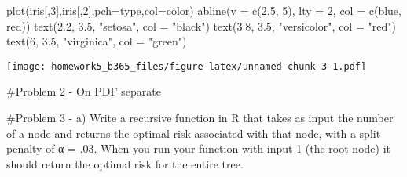 \documentclass[
]{article}
\newenvironment{Shaded}{\begin{snugshade}}{\end{snugshade}}
\newcommand{\AttributeTok}[1]{\textcolor[rgb]{0.77,0.63,0.00}{#1}}
\newcommand{\DecValTok}[1]{\textcolor[rgb]{0.00,0.00,0.81}{#1}}
\newcommand{\FloatTok}[1]{\textcolor[rgb]{0.00,0.00,0.81}{#1}}
\newcommand{\FunctionTok}[1]{\textcolor[rgb]{0.00,0.00,0.00}{#1}}
\newcommand{\NormalTok}[1]{#1}
\newcommand{\StringTok}[1]{\textcolor[rgb]{0.31,0.60,0.02}{#1}}
\begin{document}
\begin{Shaded}
\begin{Highlighting}[]
\FunctionTok{plot}\NormalTok{(iris[,}\DecValTok{3}\NormalTok{],iris[,}\DecValTok{2}\NormalTok{],}\AttributeTok{pch=}\NormalTok{type,}\AttributeTok{col=}\NormalTok{color)}
\FunctionTok{abline}\NormalTok{(}\AttributeTok{v =} \FunctionTok{c}\NormalTok{(}\FloatTok{2.5}\NormalTok{, }\DecValTok{5}\NormalTok{), }\AttributeTok{lty =} \DecValTok{2}\NormalTok{, }\AttributeTok{col =} \FunctionTok{c}\NormalTok{(}\StringTok{\textquotesingle{}blue\textquotesingle{}}\NormalTok{, }\StringTok{\textquotesingle{}red\textquotesingle{}}\NormalTok{))}
\FunctionTok{text}\NormalTok{(}\FloatTok{2.2}\NormalTok{, }\FloatTok{3.5}\NormalTok{, }\StringTok{"setosa"}\NormalTok{, }\AttributeTok{col =} \StringTok{"black"}\NormalTok{)}
\FunctionTok{text}\NormalTok{(}\FloatTok{3.8}\NormalTok{, }\FloatTok{3.5}\NormalTok{, }\StringTok{"versicolor"}\NormalTok{, }\AttributeTok{col =} \StringTok{"red"}\NormalTok{)}
\FunctionTok{text}\NormalTok{(}\DecValTok{6}\NormalTok{, }\FloatTok{3.5}\NormalTok{, }\StringTok{"virginica"}\NormalTok{, }\AttributeTok{col =} \StringTok{"green"}\NormalTok{)}
\end{Highlighting}
\end{Shaded}

\texttt{[image: homework5\_b365\_files/figure-latex/unnamed-chunk-3-1.pdf]}

\#Problem 2 - On PDF separate

\#Problem 3 - a) Write a recursive function in R that takes as input the
number of a node and returns the optimal risk associated with that node,
with a split penalty of α = .03. When you run your function with input 1
(the root node) it should return the optimal risk for the entire tree.
\end{document}
